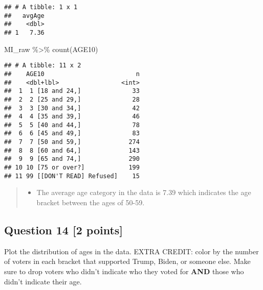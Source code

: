 \documentclass[
]{article}
\newenvironment{Shaded}{\begin{snugshade}}{\end{snugshade}}
\newcommand{\FunctionTok}[1]{\textcolor[rgb]{0.00,0.00,0.00}{#1}}
\newcommand{\NormalTok}[1]{#1}
\newcommand{\SpecialCharTok}[1]{\textcolor[rgb]{0.00,0.00,0.00}{#1}}
\providecommand{\tightlist}{%
  \setlength{\itemsep}{0pt}\setlength{\parskip}{0pt}}
\begin{document}
\begin{verbatim}
## # A tibble: 1 x 1
##   avgAge
##    <dbl>
## 1   7.36
\end{verbatim}

\begin{Shaded}
\begin{Highlighting}[]
\NormalTok{MI\_raw }\SpecialCharTok{\%\textgreater{}\%}
  \FunctionTok{count}\NormalTok{(AGE10)}
\end{Highlighting}
\end{Shaded}

\begin{verbatim}
## # A tibble: 11 x 2
##    AGE10                         n
##    <dbl+lbl>                 <int>
##  1  1 [18 and 24,]              33
##  2  2 [25 and 29,]              28
##  3  3 [30 and 34,]              42
##  4  4 [35 and 39,]              46
##  5  5 [40 and 44,]              78
##  6  6 [45 and 49,]              83
##  7  7 [50 and 59,]             274
##  8  8 [60 and 64,]             143
##  9  9 [65 and 74,]             290
## 10 10 [75 or over?]            199
## 11 99 [[DON'T READ] Refused]    15
\end{verbatim}

\begin{quote}
\begin{itemize}
\tightlist
\item
  The average age category in the data is 7.39 which indicates the age
  bracket between the ages of 50-59.
\end{itemize}
\end{quote}

\hypertarget{question-14-2-points}{%
\subsection{Question 14 {[}2 points{]}}\label{question-14-2-points}}

Plot the distribution of ages in the data. EXTRA CREDIT: color by the
number of voters in each bracket that supported Trump, Biden, or someone
else. Make sure to drop voters who didn't indicate who they voted for
\textbf{AND} those who didn't indicate their age.
\end{document}
